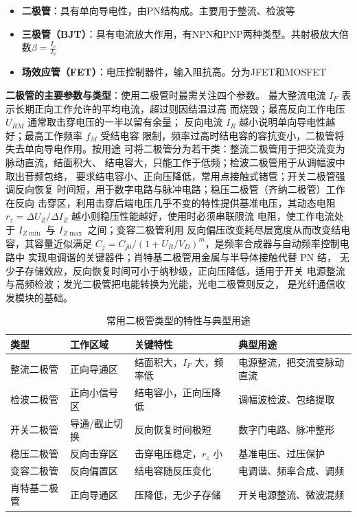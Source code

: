 \begin{itemize}
    \item \textbf{二极管}：具有单向导电性，由PN结构成。主要用于整流、检波等
    
    \item \textbf{三极管（BJT）}：具有电流放大作用，有NPN和PNP两种类型。共射极放大倍数$\beta = \frac{I_c}{I_b}$
    
    \item \textbf{场效应管（FET）}：电压控制器件，输入阻抗高。分为JFET和MOSFET
\end{itemize}

\textbf{二极管的主要参数与类型}：使用二极管时最需关注四个参数。
最大整流电流 $I_F$ 表示长期正向工作允许的平均电流，超过则因结温过高
而烧毁；最高反向工作电压 $U_{RM}$ 通常取击穿电压的一半以留有余量；
反向电流 $I_R$ 越小说明单向导电性越好；最高工作频率 $f_M$ 受结电容
限制，频率过高时结电容的容抗变小，二极管将失去单向导电作用。按用途
可将二极管分为若干类：整流二极管用于把交流变为脉动直流，结面积大、
结电容大，只能工作于低频；检波二极管用于从调幅波中取出音频包络，
要求结电容小、正向压降低，常用点接触式锗管；开关二极管强调反向恢复
时间短，用于数字电路与脉冲电路；稳压二极管（齐纳二极管）工作在反向
击穿区，利用击穿后端电压几乎不变的特性提供基准电压，其动态电阻
$r_z = \Delta U_Z/\Delta I_Z$ 越小则稳压性能越好，使用时必须串联限流
电阻，使工作电流处于 $I_{Z\min}$ 与 $I_{Z\max}$ 之间；变容二极管利用
反向偏压改变耗尽层宽度从而改变结电容，其容量近似满足
$C_j = C_{j0}/(1 + U_R/V_D)^{m}$，是频率合成器与自动频率控制电路中
实现电调谐的关键器件；肖特基二极管用金属与半导体接触代替 PN 结，
无少子存储效应，反向恢复时间可小于纳秒级，正向压降低，适用于开关
电源整流与高频检波；发光二极管把电能转换为光能，光电二极管则反之，
是光纤通信收发模块的基础。

\begin{table}[htbp]
\centering
\caption{常用二极管类型的特性与典型用途}
\begin{tabular}{|p{2.4cm}|p{3.0cm}|p{3.0cm}|p{3.2cm}|}
\hline
\textbf{类型} & \textbf{工作区域} & \textbf{关键特性} & \textbf{典型用途} \\
\hline
整流二极管 & 正向导通区 & 结面积大，$I_F$ 大，频率低 & 电源整流，把交流变脉动直流 \\
\hline
检波二极管 & 正向小信号区 & 结电容小，正向压降低 & 调幅波检波、包络提取 \\
\hline
开关二极管 & 导通/截止切换 & 反向恢复时间极短 & 数字门电路、脉冲整形 \\
\hline
稳压二极管 & 反向击穿区 & 击穿电压稳定，$r_z$ 小 & 基准电压、过压保护 \\
\hline
变容二极管 & 反向偏置区 & 结电容随反压变化 & 电调谐、频率合成、调频 \\
\hline
肖特基二极管 & 正向导通区 & 压降低，无少子存储 & 开关电源整流、微波混频 \\
\hline
\end{tabular}
\end{table}


